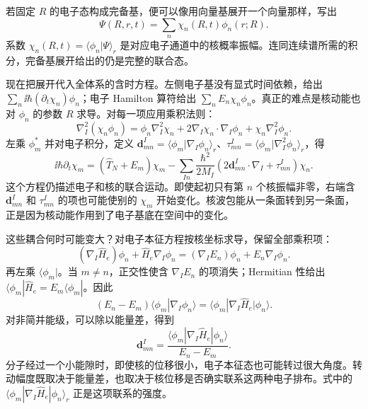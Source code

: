 若固定 $R$ 的电子态构成完备基，便可以像用向量基展开一个向量那样，写出
\begin{equation}
\Psi(R,r,t)=\sum_n\chi_n(R,t)\phi_n(r;R).
\end{equation}
系数 $\chi_n(R,t)=\langle\phi_n|\Psi\rangle_r$ 是对应电子通道中的核概率振幅。连同连续谱所需的积分，完备基展开给出的仍是完整的联合态。

现在把展开代入全体系的含时方程。左侧电子基没有显式时间依赖，给出 $\sum_n\ii\hbar(\partial_t\chi_n)\phi_n$；电子 Hamilton 算符给出 $\sum_n E_n\chi_n\phi_n$。真正的难点是核动能也对 $\phi_n$ 的参数 $R$ 求导。对每一项应用乘积法则：
\begin{equation}
\nabla_I^2(\chi_n\phi_n)=\phi_n\nabla_I^2\chi_n+2\nabla_I\chi_n\cdot\nabla_I\phi_n+\chi_n\nabla_I^2\phi_n.
\end{equation}
左乘 $\phi_m^*$ 并对电子积分，定义 $\bm d^I_{mn}=\langle\phi_m|\nabla_I\phi_n\rangle_r$、$\tau^I_{mn}=\langle\phi_m|\nabla_I^2\phi_n\rangle_r$，得
\begin{equation}
\ii\hbar\partial_t\chi_m=(\hat T_N+E_m)\chi_m
-\sum_{In}\frac{\hbar^2}{2M_I}(2\bm d^I_{mn}\cdot\nabla_I+\tau^I_{mn})\chi_n.
\end{equation}
这个方程仍描述电子和核的联合运动。即使起初只有第 $n$ 个核振幅非零，右端含 $\bm d^I_{mn}$ 和 $\tau^I_{mn}$ 的项也可能使别的 $\chi_m$ 开始变化。核波包能从一条面转到另一条面，正是因为核动能作用到了电子基底在空间中的变化。

这些耦合何时可能变大？对电子本征方程按核坐标求导，保留全部乘积项：
\begin{equation}
(\nabla_I\hat H_e)\phi_n+\hat H_e\nabla_I\phi_n
=(\nabla_IE_n)\phi_n+E_n\nabla_I\phi_n.
\end{equation}
再左乘 $\langle\phi_m|$。当 $m\ne n$，正交性使含 $\nabla_I E_n$ 的项消失；Hermitian 性给出 $\langle\phi_m|\hat H_e=E_m\langle\phi_m|$。因此
\begin{equation}
(E_n-E_m)\langle\phi_m|\nabla_I\phi_n\rangle
=\langle\phi_m|\nabla_I\hat H_e|\phi_n\rangle.
\end{equation}
对非简并能级，可以除以能量差，得到
\begin{equation}
\bm d^I_{mn}=\frac{\langle\phi_m|\nabla_I\hat H_e|\phi_n\rangle}{E_n-E_m}.
\end{equation}
分子经过一个小能隙时，即使核的位移很小，电子本征态也可能转过很大角度。转动幅度既取决于能量差，也取决于核位移是否确实联系这两种电子排布。式中的 $\langle\phi_m|\nabla_I\hat H_e|\phi_n\rangle_r$ 正是这项联系的强度。

